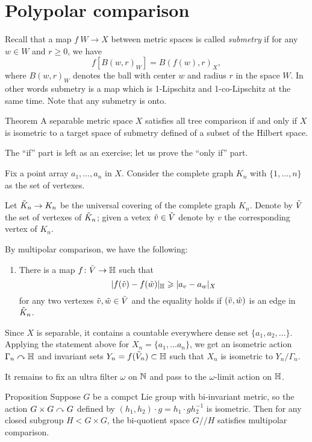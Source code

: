 \section{Polypolar comparison}\label{sec:all-tree}

Recall that a map $f\:W\to X$ between metric spaces is called \emph{submetry} if for any $w\in W$ and $r\ge 0$, we have 
\[f[B(w,r)_W]=B(f(w),r)_X,\]
where $B(w,r)_W$ denotes the ball with center $w$ and radius $r$ in the space $W$.
In other words submetry is a map which is 1-Lipschitz and 1-co-Lipschitz at the same time.
Note that any submetry is onto. 

\begin{thm}{Theorem}\label{thm:hilbert-quotient}
A separable metric space $X$ satisfies all tree comparison if and only if
$X$ is isometric to a target space of submetry defined of a subset  of the Hilbert space.
\end{thm}



The ``if'' part is left as an exercise;
let us prove the ``only if'' part.

Fix a point array $a_1,\dots, a_n$ in $X$.
Consider the complete graph $K_n$ with $\{1,\dots,n\}$ as the set of vertexes.


Let $\~ K_n\to K_n$ be the universal covering of the complete graph $K_n$.
Denote by $\~ V$ the set of vertexes of $\~ K_n$;
given a vetex $\~ v\in\~V$ denote by $v$ the corresponding vertex of $K_n$.

By multipolar comparison, we have the following:

\begin{enumerate}[$({*})$]
\item There is a map $f\:\~V\to\HH$ such that 
\[|f(\~v)-f(\~w)|_\HH\ge |a_v-a_w|_X\]
for any two vertexes $\~v,\~w\in \~ V$ and the equality holds if $(\~v,\~w)$ is an edge in $\~ K_n$.
\end{enumerate}

Since $X$ is separable, it contains a countable everywhere dense set $\{a_1,a_2,\dots\}$. 
Applying the statement above for $X_n=\{a_1,\dots a_n\}$, we get an isometric action $\Gamma_n\acts\HH$ and invariant sets $Y_n=f(\~V_n)\subset \HH$ such that $X_n$ is isometric to $Y_n/\Gamma_n$.

It remains to fix an ultra filter $\omega$ on $\NN$ and pass to the $\omega$-limit action on $\HH$. %
\qeds

\begin{thm}{Proposition}
Suppose $G$ be a compct Lie group with bi-invariant metric, so the action $G\times G\acts G$ defined by $(h_1,h_2)\cdot g=h_1\cdot g h_2^{-1}$ is isometric. 
Then for any closed subgroup $H<G\times G$, the bi-quotient space $G/\!\!/H$ satisfies multipolar comparison.
\end{thm}

